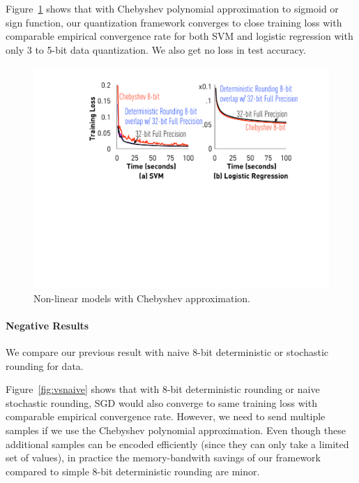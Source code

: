 \documentclass{article}
\begin{document}
Figure~\ref{fig:chebyshev} shows that with Chebyshev polynomial approximation to sigmoid 
or sign function, our quantization framework
converges to close training loss with comparable
empirical convergence rate for both SVM and logistic regression
with only 3 to 5-bit data quantization. We also get no loss in test accuracy.

\begin{figure}[t]
\centering
\includegraphics[width=\columnwidth]{final-experiments/chebyshev} 
\caption{Non-linear models with Chebyshev approximation.}
\label{fig:chebyshev}
\end{figure}

\paragraph{Negative Results}
We compare our previous result with naive 8-bit deterministic or stochastic rounding for data.

Figure~\ref{fig:vsnaive} shows that with 8-bit deterministic rounding or naive
stochastic rounding, SGD would also converge to same training loss with comparable
empirical convergence rate. However, we need to send multiple samples if we use the Chebyshev polynomial approximation. 
Even though these additional samples can be encoded efficiently (since they can only take a limited set of values), 
in practice the memory-bandwith savings of our framework
compared to simple 8-bit deterministic rounding are minor. 
\end{document}
